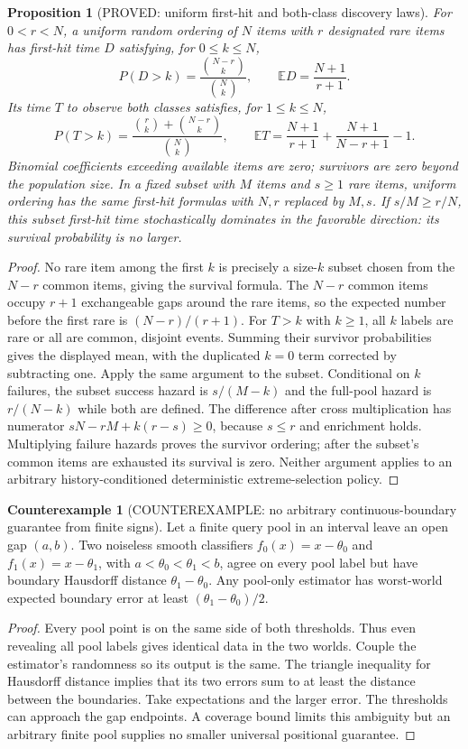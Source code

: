 \documentclass[11pt]{article}
\newtheorem{proposition}[theorem]{Proposition}
\theoremstyle{definition}
\newtheorem{counterexample}[theorem]{Counterexample}
\theoremstyle{remark}
\begin{document}
\begin{proposition}[PROVED: uniform first-hit and both-class discovery laws]
\label{prop:tail-r3}
For $0<r<N$, a uniform random ordering of $N$ items with $r$ designated
rare items has first-hit time $D$ satisfying, for $0\le k\le N$,
\[
 P(D>k)=\frac{\binom{N-r}{k}}{\binom Nk},\qquad
 \mathbb E D=\frac{N+1}{r+1}.
\]
Its time $T$ to observe both classes satisfies, for $1\le k\le N$,
\[
 P(T>k)=\frac{\binom rk+\binom{N-r}k}{\binom Nk},\qquad
 \mathbb E T=\frac{N+1}{r+1}+\frac{N+1}{N-r+1}-1.
\]
Binomial coefficients exceeding available items are zero; survivors
are zero beyond the population size.
In a fixed subset with $M$ items and $s\ge1$ rare items, uniform
ordering has the same first-hit formulas with $N,r$ replaced by $M,s$.
If $s/M\ge r/N$, this subset first-hit time stochastically dominates
in the favorable direction: its survival probability is no larger.
\end{proposition}
\begin{proof}
No rare item among the first $k$ is precisely a size-$k$ subset chosen
from the $N-r$ common items, giving the survival formula.
The $N-r$ common items occupy $r+1$ exchangeable gaps around the rare
items, so the expected number before the first rare is $(N-r)/(r+1)$.
For $T>k$ with $k\ge1$, all $k$ labels are rare or all are common,
disjoint events. Summing their survivor probabilities gives the
displayed mean, with the duplicated $k=0$ term corrected by subtracting
one. Apply the same argument to the subset.
Conditional on $k$ failures, the subset success hazard is $s/(M-k)$
and the full-pool hazard is $r/(N-k)$ while both are defined.
The difference after cross multiplication has numerator
$sN-rM+k(r-s)\ge0$, because $s\le r$ and enrichment holds.
Multiplying failure hazards proves the survivor ordering; after
the subset's common items are exhausted its survival is zero.
Neither argument applies to an arbitrary history-conditioned
deterministic extreme-selection policy.
\end{proof}

\begin{counterexample}[COUNTEREXAMPLE: no arbitrary continuous-boundary guarantee from finite signs]
\label{ce:finite-boundary-r3}
Let a finite query pool in an interval leave an open gap $(a,b)$.
Two noiseless smooth classifiers $f_0(x)=x-\theta_0$ and
$f_1(x)=x-\theta_1$, with $a<\theta_0<\theta_1<b$, agree on every
pool label but have boundary Hausdorff distance $\theta_1-\theta_0$.
Any pool-only estimator has worst-world expected boundary error at
least $(\theta_1-\theta_0)/2$.
\end{counterexample}
\begin{proof}
Every pool point is on the same side of both thresholds. Thus even
revealing all pool labels gives identical data in the two worlds.
Couple the estimator's randomness so its output is the same.
The triangle inequality for Hausdorff distance implies that its two
errors sum to at least the distance between the boundaries. Take
expectations and the larger error. The thresholds can approach the
gap endpoints. A coverage bound limits this ambiguity but an arbitrary
finite pool supplies no smaller universal positional guarantee.
\end{proof}
\end{document}
